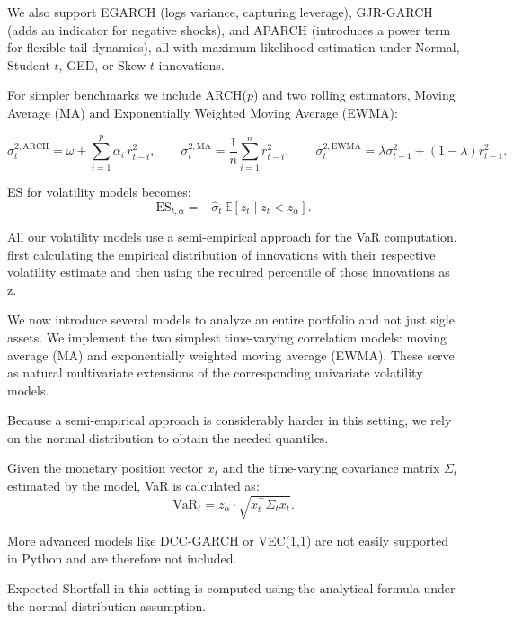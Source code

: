 \documentclass[12pt]{article}
\begin{document}
We also support EGARCH (logs variance, capturing leverage), GJR-GARCH (adds an indicator for negative shocks), and APARCH (introduces a power term for flexible tail dynamics), all with maximum-likelihood estimation under Normal, Student‐$t$, GED, or Skew-$t$ innovations.

For simpler benchmarks we include ARCH($p$) and two rolling estimators, Moving Average (MA) and Exponentially Weighted Moving Average (EWMA):

\[
\sigma_{t}^{2,\mathrm{ARCH}}=\omega+\sum_{i=1}^{p}\alpha_{i}\,r_{t-i}^{2},\qquad
\sigma_{t}^{2,\mathrm{MA}}=\frac{1}{n}\sum_{i=1}^{n}r_{t-i}^{2},\qquad
\sigma_{t}^{2,\mathrm{EWMA}}=\lambda\sigma_{t-1}^{2}+(1-\lambda)r_{t-1}^{2}.
\]

ES for volatility models becomes:
\[
  \text{ES}_{t,\alpha} = -\hat{\sigma}_t \,\mathbb{E}[z_t \mid z_t < z_\alpha].
\] 

All our volatility models use a semi-empirical approach for the VaR computation, first calculating the empirical distribution of innovations with their respective volatility estimate and then using the required percentile of those innovations as z.

\vspace{1em}
\underline{}

\vspace{0.6em}

We now introduce several models to analyze an entire portfolio and not just sigle assets.
We implement the two simplest time-varying correlation models: moving average (MA) and exponentially weighted moving average (EWMA). These serve as natural multivariate extensions of the corresponding univariate volatility models.

Because a semi-empirical approach is considerably harder in this setting, we rely on the normal distribution to obtain the needed quantiles.

Given the monetary position vector $x_t$ and the time-varying covariance matrix $\Sigma_t$ estimated by the model, VaR is calculated as:
\[
\text{VaR}_t = z_\alpha \cdot \sqrt{x_t^\top \Sigma_t x_t}.
\]

More advanced models like DCC-GARCH or VEC(1,1) are not easily supported in Python and are therefore not included.

Expected Shortfall in this setting is computed using the analytical formula under the normal distribution assumption.


\vspace{1em}
\underline{}
\end{document}
